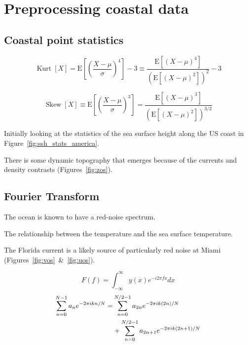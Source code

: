\section{Preprocessing coastal data}
\subsection{Coastal point statistics}

\begin{equation}
\operatorname{Kurt}[X]=
\mathrm{E}\left[\left(\frac{X-\mu}{\sigma}\right)^{4}\right]-3
\equiv \frac{\mathrm{E}\left[(X-\mu)^{4}\right]}{\left(\mathrm{E}\left[(X-\mu)^{2}\right]\right)^{2}}-3
\end{equation}

\begin{equation}
\operatorname{Skew}[X]\equiv \mathrm{E}\left[\left(\frac{X-\mu}{\sigma}\right)^{3}\right]
=\frac{\mathrm{E}\left[(X-\mu)^{3}\right]}{\left(\mathrm{E}\left[(X-\mu)^{2}\right]\right)^{3 / 2}}
\end{equation}

Initially looking at the statistics of the sea surface height along the
US coast in Figure~\ref{fig:ssh_stats_america}.



There is some dynamic topography that emerges because of the
currents and density contrasts (Figures~\ref{fig:zos}).



\subsection{Fourier Transform}
\label{sec:fourier}


The ocean is known to have a red-noise spectrum.

The relationship between the temperature and the sea surface temperature.

The Florida current is a likely source of particularly red noise at Miami
(Figures~\ref{fig:vos}~\&~\ref{fig:uos}).




\begin{equation}
F(f)=\int_{-\infty}^{\infty} y(x) e^{-i 2\pi f x} d x
\end{equation}
\begin{eqnarray}
\sum_{n=0}^{N-1} a_{n} e^{-2 \pi i  k n/ N}=&\sum_{n=0}^{N / 2-1} a_{2 n}
e^{-2 \pi i k (2 n)/ N} \notag \\ &+\sum_{n=0}^{N / 2-1} a_{2n+1} e^{-2 \pi i k (2 n+1)/ N}
\end{eqnarray}

